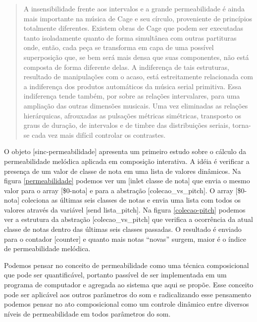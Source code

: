 \documentclass[draft]{ppgmus}
\begin{document}
\begin{quote}
  A insensibilidade frente aos intervalos e a grande permeabilidade é
  ainda mais importante na música de Cage e seu círculo, proveniente
  de princípios totalmente diferentes. Existem obras de Cage que podem
  ser executadas tanto isoladamente quanto de forma simultânea com
  outras partituras onde, então, cada peça se transforma em capa de
  uma possível superposição que, se bem será mais densa que suas
  componentes, não está composta de forma diferente delas. A
  indiferença de tais estruturas, resultado de manipulações com o
  acaso, está estreitamente relacionada com a indiferença dos produtos
  automáticos da música serial primitiva. Essa indiferença tende
  também, por sobre as relações intervalares, para uma ampliação das
  outras dimensões musicais. Uma vez eliminadas as relações
  hierárquicas, afrouxadas as pulsações métricas simétricas,
  transposto os graus de duração, de intervalos e de timbre das
  distribuições seriais, torna-se cada vez mais difícil controlar os
  contrastes. \cite{ligeti58:transformacoes}
\end{quote}


O objeto [sinc-permeabilidade] apresenta um primeiro estudo sobre 
o cálculo da permeabilidade melódica aplicada em composição interativa.
A idéia é verificar a presença de um valor de classe de nota em uma lista
de valores dinâmicos. Na figura \ref{permeabilidade} podemos ver um [inlet classe de nota]
que envia o mesmo valor para o array [\$0-nota] e para a abstração [colecao\_vs\_pitch].
O array [\$0-nota] coleciona as últimas seis classes de notas e envia uma lista com
todos os valores através da variável [send lista\_pitch]. Na figura \ref{colecao-pitch}
podemos ver a estrutura da abstração [colecao\_vs\_pitch] que verifica a ocorrência
da atual classe de notas dentro das últimas seis classes passadas. O resultado é enviado
para o contador [counter] e quanto mais notas ``novas'' surgem, maior é o índice de 
permeabilidade melódica.


Podemos pensar no conceito de permeabilidade como uma técnica composicional
que pode ser quantificável, portanto passível de ser implementada em um programa
de computador e agregada ao sistema que aqui se propõe. Esse conceito pode ser
aplicável aos outros parâmetros do som e radicalizando esse pensamento podemos
pensar no ato composicional como um controle dinâmico entre diversos níveis de 
permeabilidade em todos parâmetros do som.
\end{document}
